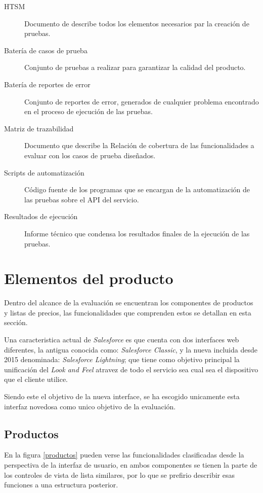\begin{description}
\item [HTSM] Documento de describe todos los elementos necesarios par la creación
    de pruebas.
\item [Batería de casos de prueba] Conjunto de pruebas a realizar para garantizar
    la calidad del producto.
\item [Batería de reportes de error] Conjunto de reportes de error, generados de
    cualquier problema encontrado en el proceso de ejecución de las pruebas.
\item [Matriz de trazabilidad] Documento que describe la Relación de cobertura
    de las funcionalidades a evaluar con los casos de prueba diseñados.
\item [Scripts de automatización] Código fuente de los programas que se encargan
    de la automatización de las pruebas sobre el API del servicio.
\item [Resultados de ejecución] Informe técnico que condensa los resultados
    finales de la ejecución de las pruebas.
\end{description}

\section{Elementos del producto}
Dentro del alcance de la evaluación se encuentran los componentes de productos
y listas de precios, las funcionalidades que comprenden estos se detallan en
esta sección.

Una caracteristica actual de \emph{Salesforce} es que cuenta con dos interfaces
web diferentes, la antigua conocida como: \emph{Salesforce Classic}, y la nueva
incluida desde 2015 denominada: \emph{Salesforce Lightning}; que tiene como
objetivo principal la unificación del \emph{Look and Feel} atravez de todo el
servicio sea cual sea el dispositivo que el cliente utilice\cite{McCarthy}.

Siendo este el objetivo de la nueva interface, se ha escogido unicamente esta
interfaz novedosa como unico objetivo de la evaluación.

\subsection{Productos}
En la figura \ref{productos} pueden verse las funcionalidades clasificadas desde
la perspectiva de la interfaz de usuario, en ambos componentes se tienen la
parte de los controles de vista de lista similares, por lo que se prefirio
describir esas funciones a una estructura posterior.

